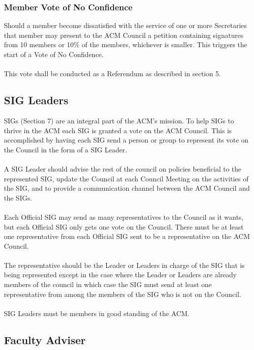 \documentclass[12pt,titlepage]{article}
\begin{document}
\subsubsection{Member Vote of No Confidence}

Should a member become dissatisfied with the service of one or more Secretaries that member may present to the ACM Council a petition containing signatures from 10 members or 10\% of the members, whichever is smaller. This triggers the start of a Vote of No Confidence.\\
\\
This vote shall be conducted as a Referendum as described in section 5.

\subsection{SIG Leaders}

SIGs (Section 7) are an integral part of the ACM's mission. To help SIGs to thrive in the ACM each SIG is granted a vote on the ACM Council. This is accomplished by having each SIG send a person or group to represent its vote on the Council in the form of a SIG Leader.\\
\\
A SIG Leader should advise the rest of the council on policies beneficial to the represented SIG, update the Council at each Council Meeting on the activities of the SIG, and to provide a communication channel between the ACM Council and the SIGs.\\
\\
Each Official SIG may send as many representatives to the Council as it wants, but each Official SIG only gets one vote on the Council. There must be at least one representative from each Official SIG sent to be a representative on the ACM Council.\\
\\
The representative should be the Leader or Leaders in charge of the SIG that is being represented except in the case where the Leader or Leaders are already members of the council in which case the SIG must send at least one representative from among the members of the SIG who is not on the Council.\\
\\
SIG Leaders must be members in good standing of the ACM.

\subsection{Faculty Adviser}
\end{document}
